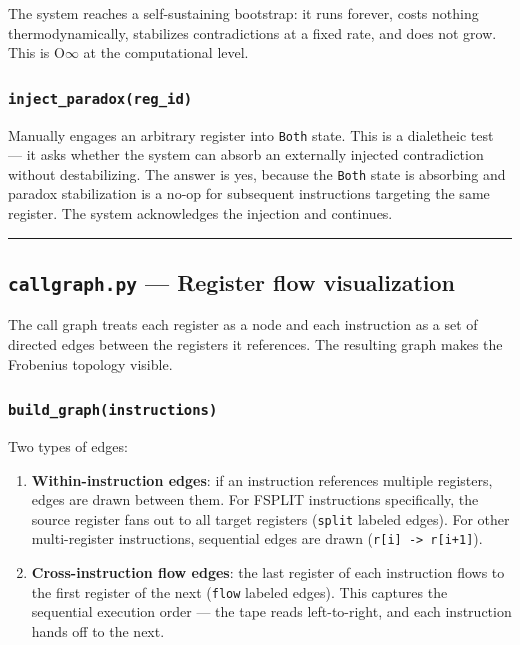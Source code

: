 \documentclass[12pt,a4paper]{article}
\begin{document}
The system reaches a self-sustaining bootstrap: it runs forever, costs nothing thermodynamically, stabilizes contradictions at a fixed rate, and does not grow. This is O$\infty$ at the computational level.

\subsubsection{\texttt{inject\_paradox(reg\_id)}}

Manually engages an arbitrary register into \texttt{Both} state. This is a dialetheic test --- it asks whether the system can absorb an externally injected contradiction without destabilizing. The answer is yes, because the \texttt{Both} state is absorbing and paradox stabilization is a no-op for subsequent instructions targeting the same register. The system acknowledges the injection and continues.

\begin{center}
\rule{0.5\textwidth}{0.4pt}
\end{center}

\subsection{\texttt{callgraph.py} --- Register flow visualization}

The call graph treats each register as a node and each instruction as a set of directed edges between the registers it references. The resulting graph makes the Frobenius topology visible.

\subsubsection{\texttt{build\_graph(instructions)}}

Two types of edges:

\begin{enumerate}
    \item \textbf{Within-instruction edges}: if an instruction references multiple registers, edges are drawn between them. For FSPLIT instructions specifically, the source register fans out to all target registers (\texttt{split} labeled edges). For other multi-register instructions, sequential edges are drawn (\texttt{r{[}i{]} -\textgreater{} r{[}i+1{]}}).
    \item \textbf{Cross-instruction flow edges}: the last register of each instruction flows to the first register of the next (\texttt{flow} labeled edges). This captures the sequential execution order --- the tape reads left-to-right, and each instruction hands off to the next.
\end{enumerate}
\end{document}
